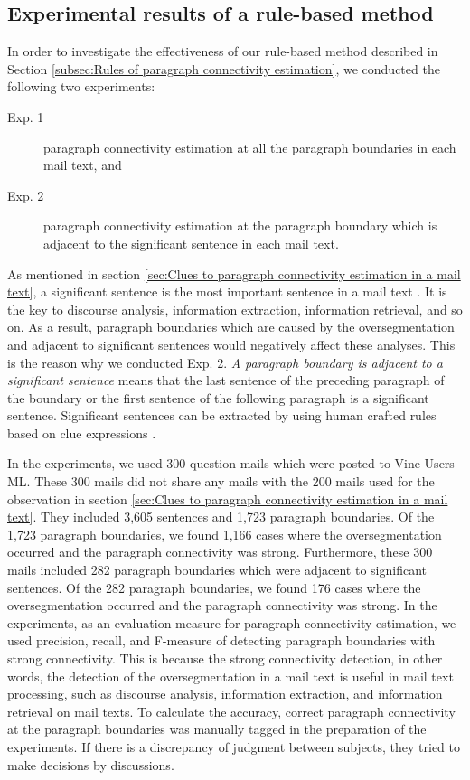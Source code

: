 \documentclass[english]{jnlp_1.4}
\begin{document}
\subsection{Experimental results of a rule-based method}
\label{subsec:Experimental results of a rule-based method}


In order to investigate the effectiveness of our rule-based method 
described in Section \ref{subsec:Rules of paragraph connectivity estimation}, 
we conducted the following two experiments:
\begin{description}
 \item[Exp. 1] paragraph connectivity estimation 
	    at all the paragraph boundaries in each mail text, and 
	    
 \item[Exp. 2] paragraph connectivity estimation 
	    at the paragraph boundary
	    which is adjacent to the significant sentence in each mail text.
\end{description}
As mentioned in 
section \ref{sec:Clues to paragraph connectivity estimation in a mail text}, 
a significant sentence is the most important sentence in a mail text
\cite{thesis:watanabe2008}. 
It is the key to 
discourse analysis, information extraction, information retrieval, and so on. 
As a result, 
paragraph boundaries which are caused by the oversegmentation 
and adjacent to significant sentences
would negatively affect these analyses.
This is the reason why we conducted Exp. 2.
\textit{A paragraph boundary is adjacent to a significant sentence} means that 
the last sentence of the preceding paragraph of the boundary or 
the first sentence of the following paragraph is a significant sentence.
Significant sentences can be extracted 
by using human crafted rules based on clue expressions \cite{thesis:watanabe2008}.



In the experiments, 
we used 300 question mails which were posted to Vine Users ML.
These 300 mails did not share any mails with the 200 mails 
used for the observation 
in section \ref{sec:Clues to paragraph connectivity estimation in a mail text}.
They included  
3,605 sentences and 
1,723 paragraph boundaries.
Of the 1,723 paragraph boundaries, 
we found 
1,166 cases where the oversegmentation occurred and 
the paragraph connectivity was strong. 
Furthermore, 
these 300 mails included  
282 paragraph boundaries which were adjacent to significant sentences.
Of the 282 paragraph boundaries, 
we found 
176 cases where the oversegmentation occurred and 
the paragraph connectivity was strong. 
In the experiments, 
as an evaluation measure for paragraph connectivity estimation, 
we used precision, recall, and F-measure of
detecting paragraph boundaries with strong connectivity.
This is because 
the strong connectivity detection, 
in other words,
the detection of the oversegmentation in a mail text is 
useful in mail text processing, 
such as discourse analysis, information extraction, and information retrieval on mail texts. 
To calculate the accuracy, 
correct paragraph connectivity at the paragraph boundaries was
manually tagged in the preparation of the experiments.
If there is a discrepancy of judgment between subjects, 
they tried to make decisions by discussions.
\end{document}
